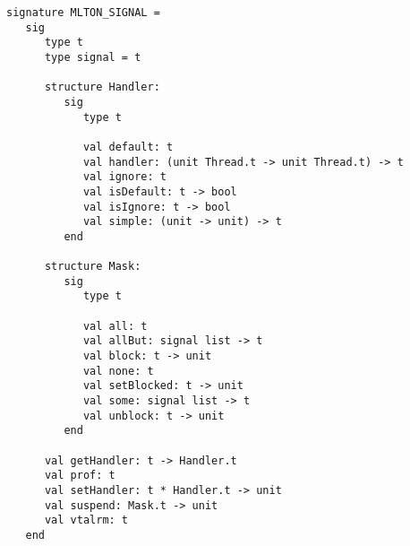 \begin{verbatim}
signature MLTON_SIGNAL =
   sig
      type t
      type signal = t

      structure Handler:
         sig
            type t

            val default: t
            val handler: (unit Thread.t -> unit Thread.t) -> t
            val ignore: t
            val isDefault: t -> bool
            val isIgnore: t -> bool
            val simple: (unit -> unit) -> t
         end

      structure Mask:
         sig
            type t
               
            val all: t
            val allBut: signal list -> t
            val block: t -> unit
            val none: t
            val setBlocked: t -> unit
            val some: signal list -> t
            val unblock: t -> unit
         end

      val getHandler: t -> Handler.t
      val prof: t
      val setHandler: t * Handler.t -> unit
      val suspend: Mask.t -> unit
      val vtalrm: t
   end
\end{verbatim}

